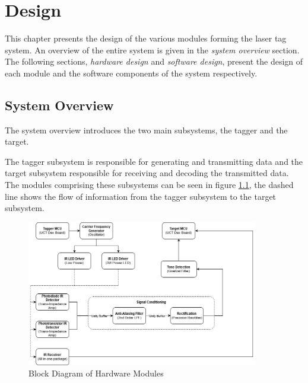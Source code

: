 \chapter{Design}
\label{ch_design}

This chapter presents the design of the various modules forming the laser tag system. An overview of the entire system is given in the \textit{system overview} section. The following sections, \textit{hardware design} and \textit{software design}, present the design of each module and the software components of the system respectively.


\section{System Overview}
The system overview introduces the two main subsystems, the tagger and the target.

The tagger subsystem is responsible for generating and transmitting data and the target subsystem responsible for receiving and decoding the transmitted data. The modules comprising these subsystems can be seen in figure \ref{fig:system_overview_hardware}, the dashed line shows the flow of information from the tagger subsystem to the target subsystem.

\begin{figure}[H]
	\centering
	\includegraphics[width=0.9\textwidth]{figures/design/system_overview_hardware}
	\caption{Block Diagram of Hardware Modules}
	\label{fig:system_overview_hardware}
\end{figure}

